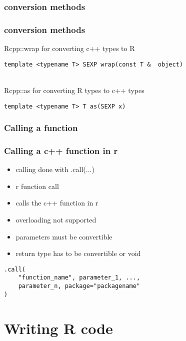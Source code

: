 \documentclass[hyperef={
    colorlinks=true,
    linkcolor=blue,
    filecolor=black,
urlcolor=blue}
]{beamer}
\begin{document}
\subsubsection{conversion methods}
\begin{frame}[fragile]
\frametitle{conversion methods}
Rcpp::wrap for converting c++ types to R
\begin{verbatim}
template <typename T> SEXP wrap(const T &  object)
\end{verbatim}
\hspace{4 mm} \\
Rcpp::as for converting R types to c++ types
\begin{verbatim}
template <typename T> T as(SEXP x)
\end{verbatim} 
\end{frame}

\subsubsection{Calling a function}
\begin{frame}[fragile]
\frametitle{Calling a c++ function in r}
\begin{itemize}
    \item calling done with .call(...)
    \item r function call
    \item calls the c++ function in r
    \item overloading not supported
    \item parameters must be convertible
    \item return type has to be convertible or void
\end{itemize}
\begin{verbatim}
.call(
    "function_name", parameter_1, ...,
    parameter_n, package="packagename"
)
\end{verbatim}
\end{frame}

\section{Writing R code}
\end{document}
